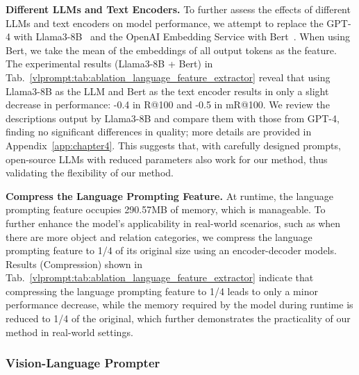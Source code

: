 \noindent \textbf{Different LLMs and Text Encoders.}
To further assess the effects of different LLMs and text encoders on model performance, we attempt to replace the GPT-4 with Llama3-8B~\citep{touvron2023llama} and the OpenAI Embedding Service with Bert~\citep{devlin2018bert}.
When using Bert, we take the mean of the embeddings of all output tokens as the feature.
The experimental results (Llama3-8B + Bert) in Tab.~\ref{vlprompt:tab:ablation_language_feature_extractor} reveal that using Llama3-8B as the LLM and Bert as the text encoder results in only a slight decrease in performance: -0.4 in R@100 and -0.5 in mR@100.
We review the descriptions output by Llama3-8B and compare them with those from GPT-4, finding no significant differences in quality; more details are provided in Appendix~\ref{app:chapter4}.
This suggests that, with carefully designed prompts, open-source LLMs with reduced parameters also work for our method, thus validating the flexibility of our method.

\noindent \textbf{Compress the Language Prompting Feature.}
At runtime, the language prompting feature occupies 290.57MB of memory, which is manageable.
To further enhance the model's applicability in real-world scenarios, such as when there are more object and relation categories, we compress the language prompting feature to 1/4 of its original size using an encoder-decoder models.
Results (Compression) shown in Tab.~\ref{vlprompt:tab:ablation_language_feature_extractor} indicate that compressing the language prompting feature to 1/4 leads to only a minor performance decrease, while the memory required by the model during runtime is reduced to 1/4 of the original, which further demonstrates the practicality of our method in real-world settings.



\subsubsection{Vision-Language Prompter}

\begin{table}[!t]
    \centering
    \setlength{\tabcolsep}{2.8mm}
    \caption{Ablation study for the Vision-Language Prompter.}
    \label{vlprompt:tab:ablation_vision_language_prompter}
\end{table}

